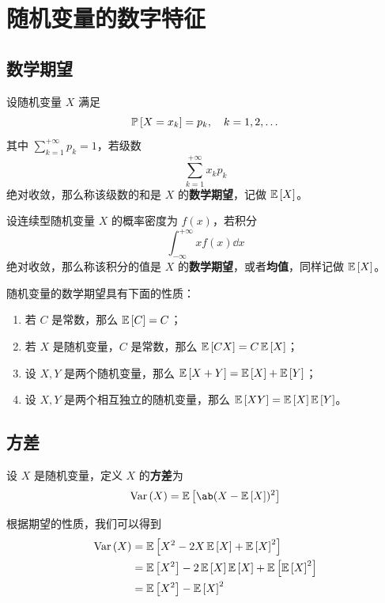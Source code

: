\section{随机变量的数字特征}

\subsection{数学期望}

\begin{definition}[数学期望]
    设随机变量 $X$ 满足
    $$
    \prob{X = x_k} = p_k, \quad k = 1, 2, \dots
    $$
    其中 $\sum_{k = 1}^{+ \infty} p_k = 1$，若级数
    $$
    \sum_{k = 1}^{+ \infty} x_k p_k
    $$
    绝对收敛，那么称该级数的和是 $X$ 的\textbf{数学期望}，记做 $\expect{X}$。

    设连续型随机变量 $X$ 的概率密度为 $f(x)$，若积分
    $$
    \int_{- \infty}^{+ \infty} x f(x) \dd{x}
    $$
    绝对收敛，那么称该积分的值是 $X$ 的\textbf{数学期望}，或者\textbf{均值}，同样记做 $\expect{X}$。
\end{definition}

随机变量的数学期望具有下面的性质：

\begin{enumerate}
    \item 若 $C$ 是常数，那么 $\expect{C} = C$；
    \item 若 $X$ 是随机变量，$C$ 是常数，那么 $\expect{C X} = C \expect{X}$；
    \item 设 $X, Y$ 是两个随机变量，那么 $\expect{X + Y} = \expect{X} + \expect{Y}$；
    \item 设 $X, Y$ 是两个相互独立的随机变量，那么 $\expect{X Y} = \expect{X} \expect{Y}$。
\end{enumerate}

\subsection{方差}

\begin{definition}[方差]
    设 $X$ 是随机变量，定义 $X$ 的\textbf{方差}为
    $$
    \variance{X} = \expect{\ab(X - \expect{X})^2}
    $$
\end{definition}

根据期望的性质，我们可以得到
$$
\begin{aligned}
    \variance{X} & = \expect{X^2 - 2 X \expect{X} + \expect{X}^2} \\
    & = \expect{X^2} - 2 \expect{X} \expect{X} + \expect{\expect{X}^2} \\
    & = \expect{X^2} - \expect{X}^2
\end{aligned}
$$


